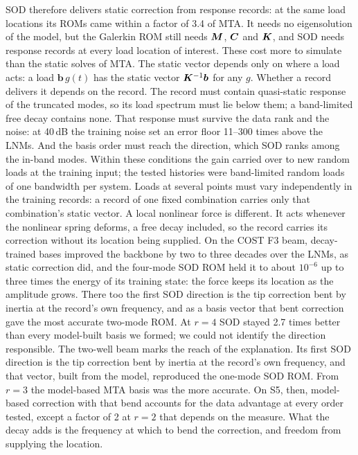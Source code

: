 \documentclass[preprint,12pt]{elsarticle}
\begin{document}
SOD therefore delivers static correction from response records: at the same load locations its ROMs came within a factor of 3.4 of MTA. It needs no eigensolution of the model, but the Galerkin ROM still needs $\bm{M}$, $\bm{C}$ and $\bm{K}$, and SOD needs response records at every load location of interest. These cost more to simulate than the static solves of MTA.
The static vector depends only on where a load acts: a load $\bm{b}\,g(t)$ has the static vector $\bm{K}^{-1}\bm{b}$ for any $g$. Whether a record delivers it depends on the record. The record must contain quasi-static response of the truncated modes, so its load spectrum must lie below them; a band-limited free decay contains none. That response must survive the data rank and the noise: at 40\,dB the training noise set an error floor 11--300 times above the LNMs. And the basis order must reach the direction, which SOD ranks among the in-band modes. Within these conditions the gain carried over to new random loads at the training input; the tested histories were band-limited random loads of one bandwidth per system. Loads at several points must vary independently in the training records: a record of one fixed combination carries only that combination's static vector.
A local nonlinear force is different. It acts whenever the nonlinear spring deforms, a free decay included, so the record carries its correction without its location being supplied. On the COST F3 beam, decay-trained bases improved the backbone by two to three decades over the LNMs, as static correction did, and the four-mode SOD ROM held it to about $10^{-6}$ up to three times the energy of its training state: the force keeps its location as the amplitude grows. There too the first SOD direction is the tip correction bent by inertia at the record's own frequency, and as a basis vector that bent correction gave the most accurate two-mode ROM. At $r=4$ SOD stayed 2.7 times better than every model-built basis we formed; we could not identify the direction responsible. The two-well beam marks the reach of the explanation. Its first SOD direction is the tip correction bent by inertia at the record's own frequency, and that vector, built from the model, reproduced the one-mode SOD ROM. From $r=3$ the model-based MTA basis was the more accurate. On S5, then, model-based correction with that bend accounts for the data advantage at every order tested, except a factor of 2 at $r=2$ that depends on the measure. What the decay adds is the frequency at which to bend the correction, and freedom from supplying the location.
\end{document}
